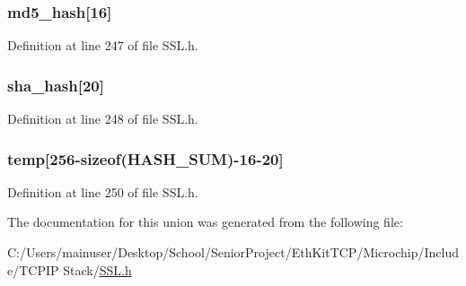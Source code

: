 \subsubsection[{md5\+\_\+hash}]{ md5\+\_\+hash\mbox{[}16\mbox{]}}\label{union_s_s_l___b_u_f_f_e_r_a4d816c823a2beb8993b3ef56766bacce}


Definition at line 247 of file S\+S\+L.\+h.

\hypertarget{union_s_s_l___b_u_f_f_e_r_a5d335aa13662b316b20dbc8b6f34b12b}{}
\subsubsection[{sha\+\_\+hash}]{ sha\+\_\+hash\mbox{[}20\mbox{]}}\label{union_s_s_l___b_u_f_f_e_r_a5d335aa13662b316b20dbc8b6f34b12b}


Definition at line 248 of file S\+S\+L.\+h.

\hypertarget{union_s_s_l___b_u_f_f_e_r_a7b17c7a8a20473315a63c02148759677}{}
\subsubsection[{temp}]{ temp\mbox{[}256-\/sizeof({\bf H\+A\+S\+H\+\_\+\+S\+U\+M})-\/16-\/20\mbox{]}}\label{union_s_s_l___b_u_f_f_e_r_a7b17c7a8a20473315a63c02148759677}


Definition at line 250 of file S\+S\+L.\+h.



The documentation for this union was generated from the following file\+:\begin{DoxyCompactItemize}
\item 
C\+:/\+Users/mainuser/\+Desktop/\+School/\+Senior\+Project/\+Eth\+Kit\+T\+C\+P/\+Microchip/\+Include/\+T\+C\+P\+I\+P Stack/\hyperlink{_s_s_l_8h}{S\+S\+L.\+h}\end{DoxyCompactItemize}
